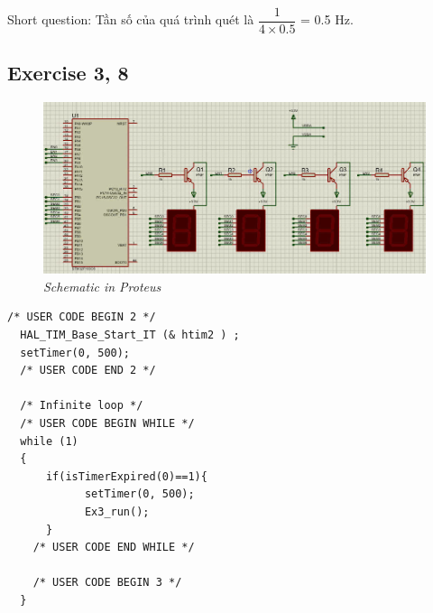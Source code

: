 Short question: Tần số của quá trình quét là $\dfrac{1}{4\times0.5}$ = 0.5 Hz.
\subsection{Exercise 3, 8}
\begin{figure}[!htp]
    \centering
    \includegraphics[width=5.5in]{source/picture/bai_2/pic3.jpg}
    \caption{\textit{ Schematic in Proteus}}
    \label{bai2_pic1a}
\end{figure}
\begin{lstlisting}[caption=main.c]
/* USER CODE BEGIN 2 */
  HAL_TIM_Base_Start_IT (& htim2 ) ;
  setTimer(0, 500);
  /* USER CODE END 2 */

  /* Infinite loop */
  /* USER CODE BEGIN WHILE */
  while (1)
  {
	  if(isTimerExpired(0)==1){
	  	 	setTimer(0, 500);
	  	 	Ex3_run();
	  }
    /* USER CODE END WHILE */

    /* USER CODE BEGIN 3 */
  }
\end{lstlisting}
